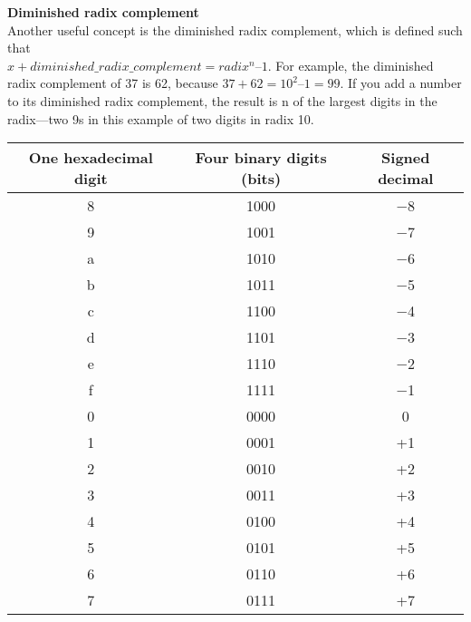 \documentclass[12pt]{extarticle}
\begin{document}
\vspace{18pt}
\textbf{Diminished radix complement}\\
Another useful concept is the diminished radix complement, which is defined such that\\
$x + diminished\_radix\_complement = radix^n – 1$. For example, the diminished radix 
complement of 37 is 62, because $37 + 62 = 10^2 – 1 = 99$. If you add a number to 
its diminished radix complement, the result is n of the largest digits in the radix—two
9s in this example of two digits in radix 10.

\begin{tabular}{c|c|c}
\hline 
One hexadecimal digit & Four binary digits (bits) & Signed decimal \\
\hline 
8 &  1000 &  −8 \\ 
9 &  1001 &  −7 \\
a &  1010 &  −6 \\
b &  1011 &  −5 \\
c &  1100 &  −4 \\
d &  1101 &  −3 \\
e &  1110 &  −2 \\
f &  1111 &  −1 \\
0 &  0000 &  0  \\
1 &  0001 &  +1 \\
2 &  0010 &  +2 \\
3 &  0011 &  +3 \\
4 &  0100 &  +4 \\
5 &  0101 &  +5 \\
6 &  0110 &  +6 \\
7 &  0111 &  +7 \\
\hline 
\end{tabular}
\end{document}
